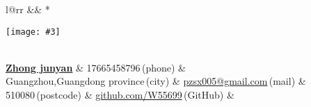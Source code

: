 \newcommand{\paint}[3]{
    \begin{minipage}{#1}
        \texttt{[image: \#3]}
    \end{minipage}
}
\newcommand{\myheader}{
\begin{tabular*}{\textwidth}{l@{\extracolsep{\fill}}rr}
  && \multirow{4}*{\paint{2.6cm}{3.2cm}{./image.jpg}}\\
\textbf{\href{http://herechen.github.io}{\LARGE Zhong junyan}} & 17665458796$\,${\color{labelgrey}(phone)} &\\
 Guangzhou,Guangdong province$\,${\color{labelgrey}(city)} & \href{mailto:pzsx005@gmail.com}{pzsx005@gmail.com}$\,${\color{labelgrey}(mail)} & \\
  510080$\,${\color{labelgrey}(postcode)} & \href{https://github.com/W55699}{github.com/W55699}$\,${\color{labelgrey}(GitHub)} & \\
  \end{tabular*}\\\vspace{0.1in}
}

\myheader

